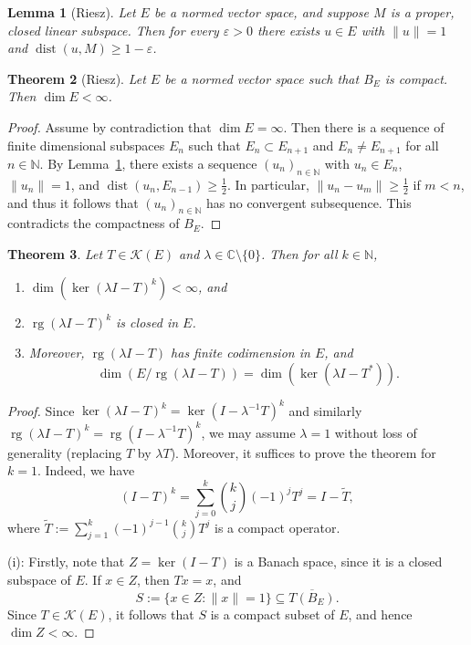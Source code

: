 \documentclass[11pt]{article}
\numberwithin{equation}{section}
\theoremstyle{plain}
\newtheorem{theorem}{Theorem}[section]
\newtheorem{lemma}[theorem]{Lemma}
\theoremstyle{definition}
\newcommand{\NN}{\mathbb{N}}
\newcommand{\CC}{\mathbb{C}}
\DeclareMathOperator{\rg}{\mathrm{rg}}
\DeclareMathOperator{\dist}{\mathrm{dist}}
\begin{document}
	\begin{lemma}[Riesz]
		\label{lem:Riesz}
		Let $E$ be a normed vector space, and suppose $M$ is a proper, closed linear subspace. Then for every $\varepsilon >0$ there exists $u\in E$ with $\|u\|=1$ and $\dist(u,M)\ge 1-\varepsilon$.
	\end{lemma}
	
	\begin{theorem}[Riesz]
		\label{thm:compact-ball}
		Let $E$ be a normed vector space such that $B_E$ is compact. Then $\dim E < \infty$.
	\end{theorem}
	\begin{proof}
		Assume by contradiction that $\dim E = \infty$. Then there is a sequence of finite dimensional subspaces $E_n$ such that $E_n \subset E_{n+1}$ and $E_n \ne E_{n+1}$ for all $n\in\NN$. By Lemma~\ref{lem:Riesz}, there exists a sequence $(u_n)_{n\in\NN}$ with $u_n\in E_n$, $\|u_n\|=1$, and $\dist(u_n,E_{n-1})\ge \frac{1}{2}$. In particular, $\|u_n-u_m\|\ge \frac{1}{2}$ if $m<n$, and thus it follows that $(u_n)_{n\in\NN}$ has no convergent subsequence. This contradicts the compactness of $B_E$.
	\end{proof}
	
	\begin{theorem}
		\label{thm:Riesz-Fredholm}
		Let $T\in\mathcal{K}(E)$ and $\lambda\in\CC\setminus\{0\}$. Then for all $k\in\NN$,
		\begin{enumerate}[\upshape (i)]
			\item $\dim(\ker(\lambda I-T)^k) < \infty$, and
			\item $\rg(\lambda I-T)^k$ is closed in $E$.
			\item Moreover, $\rg(\lambda I-T)$ has finite codimension in $E$, and
			\begin{equation*}
				\dim(E/\rg(\lambda I-T)) = \dim(\ker(\lambda I-T^*)).
			\end{equation*}
		\end{enumerate}
	\end{theorem}
	\begin{proof}
		Since $\ker(\lambda I-T)^k = \ker(I-\lambda^{-1}T)^k$ and similarly $\rg(\lambda I-T)^k = \rg(I-\lambda^{-1}T)^k$, we may assume $\lambda=1$ without loss of generality (replacing $T$ by $\lambda T$). Moreover, it suffices to prove the theorem for $k=1$. Indeed, we have
		\begin{equation*}
			(I-T)^k = \sum_{j=0}^k \binom{k}{j}(-1)^j T^j = I - \tilde{T},
		\end{equation*}
		where $\tilde{T} := \sum_{j=1}^k (-1)^{j-1}\binom{k}{j}T^j$ is a compact operator.
		
		(i): Firstly, note that $Z=\ker(I-T)$ is a Banach space, since it is a closed subspace of $E$. If $x\in Z$, then $Tx=x$, and
		\begin{equation*}
			S := \{x\in Z : \|x\|=1\} \subseteq \overline{T(B_E)}.
		\end{equation*}
		Since $T\in\mathcal{K}(E)$, it follows that $S$ is a compact subset of $E$, and hence $\dim Z < \infty$.
	\end{proof}
	
	
\end{document}
